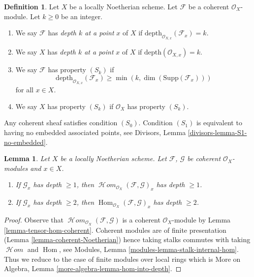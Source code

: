 \documentclass{stacks-project}
\theoremstyle{plain}
\newtheorem{lemma}[subsection]{Lemma}
\theoremstyle{definition}
\newtheorem{definition}[subsection]{Definition}
\theoremstyle{remark}
\numberwithin{equation}{subsection}
\def\Hom{\mathop{\mathrm{Hom}}\nolimits}
\def\SheafHom{\mathop{\mathcal{H}\!\mathit{om}}\nolimits}
\begin{document}
\begin{definition}
\label{definition-depth}
Let $X$ be a locally Noetherian scheme.
Let $\mathcal{F}$ be a coherent $\mathcal{O}_X$-module.
Let $k \geq 0$ be an integer.
\begin{enumerate}
\item We say $\mathcal{F}$ has {\it depth $k$ at a point}
$x$ of $X$ if $\text{depth}_{\mathcal{O}_{X, x}}(\mathcal{F}_x) = k$.
\item We say $X$ has {\it depth $k$ at a point} $x$ of $X$ if
$\text{depth}(\mathcal{O}_{X, x}) = k$.
\item We say $\mathcal{F}$ has property {\it $(S_k)$} if
$$
\text{depth}_{\mathcal{O}_{X, x}}(\mathcal{F}_x)
\geq \min(k, \dim(\text{Supp}(\mathcal{F}_x)))
$$
for all $x \in X$.
\item We say $X$ has property {\it $(S_k)$} if $\mathcal{O}_X$ has
property $(S_k)$.
\end{enumerate}
\end{definition}

\noindent
Any coherent sheaf satisfies condition $(S_0)$.
Condition $(S_1)$ is equivalent to having no embedded associated
points, see Divisors, Lemma \ref{divisors-lemma-S1-no-embedded}.

\begin{lemma}
\label{lemma-hom-into-depth}
Let $X$ be a locally Noetherian scheme. Let $\mathcal{F}$, $\mathcal{G}$
be coherent $\mathcal{O}_X$-modules and $x \in X$.
\begin{enumerate}
\item If $\mathcal{G}_x$ has depth $\geq 1$, then
$\SheafHom_{\mathcal{O}_X}(\mathcal{F}, \mathcal{G})_x$
has depth $\geq 1$.
\item If $\mathcal{G}_x$ has depth $\geq 2$, then
$\Hom_{\mathcal{O}_X}(\mathcal{F}, \mathcal{G})_x$ has depth $\geq 2$.
\end{enumerate}
\end{lemma}

\begin{proof}
Observe that $\SheafHom_{\mathcal{O}_X}(\mathcal{F}, \mathcal{G})$ is
a coherent $\mathcal{O}_X$-module by Lemma \ref{lemma-tensor-hom-coherent}.
Coherent modules are of finite presentation
(Lemma \ref{lemma-coherent-Noetherian}) hence taking stalks commutes
with taking $\SheafHom$ and $\Hom$, see
Modules, Lemma \ref{modules-lemma-stalk-internal-hom}.
Thus we reduce to the case of finite modules over local
rings which is More on Algebra, Lemma \ref{more-algebra-lemma-hom-into-depth}.
\end{proof}
\end{document}
